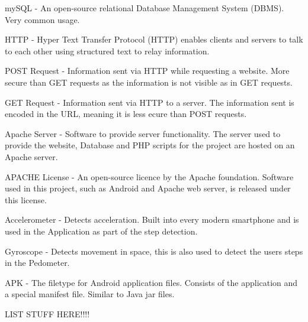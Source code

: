\documentclass{l4proj}
\begin{document}
mySQL - An open-source relational Database Management System (DBMS). Very common usage.

HTTP - Hyper Text Transfer Protocol (HTTP) enables clients and servers to talk to each other using structured text to relay information.

POST Request - Information sent via HTTP while requesting a website. More secure than GET requests as the information is not visible as in GET requests.

GET Request - Information sent via HTTP to a server. The information sent is encoded in the URL, meaning it is less ecure than POST requests.

Apache Server - Software to provide server functionality. The server used to provide the website, Database and PHP scripts for the project are hosted on an Apache server.

APACHE License - An open-source licence by the Apache foundation. Software used in this project, such as Android and Apache web server, is released under this license.

Accelerometer - Detects acceleration. Built into every modern smartphone and is used in the Application as part of the step detection.

Gyroscope - Detects movement in space, this is also used to detect the users steps in the Pedometer.

APK - The filetype for Android application files. Consists of the application and a special manifest file. Similar to Java jar files.

LIST STUFF HERE!!!!
\end{document}
